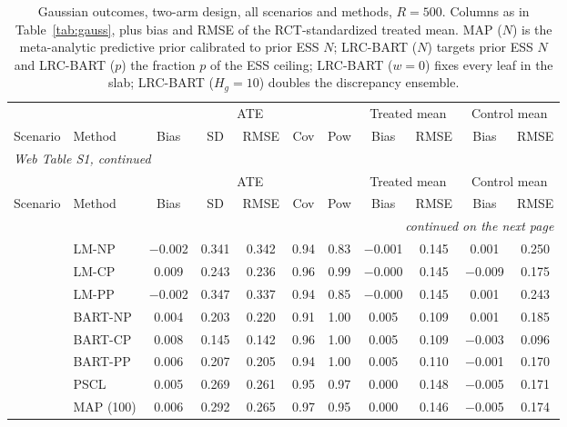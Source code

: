 \documentclass[11pt]{article}
\theoremstyle{definition}
\theoremstyle{plain}
\begin{document}
\begin{center}
\scriptsize
\setlength{\tabcolsep}{3.5pt}
\renewcommand{\arraystretch}{0.8}
\begin{longtable}{llccccccccc}
\caption{Gaussian outcomes, two-arm design, all scenarios and methods, $R=500$. Columns as in Table~\ref{tab:gauss}, plus bias and RMSE of the RCT-standardized treated mean. MAP ($N$) is the meta-analytic predictive prior calibrated to prior ESS $N$; LRC-BART ($N$) targets prior ESS $N$ and LRC-BART ($p$) the fraction $p$ of the ESS ceiling; LRC-BART ($w=0$) fixes every leaf in the slab; LRC-BART ($H_g=10$) doubles the discrepancy ensemble.}\label{tab:gauss_full}\\
\toprule
& & \multicolumn{5}{c}{ATE} & \multicolumn{2}{c}{Treated mean} & \multicolumn{2}{c}{Control mean} \\
\cmidrule(lr){3-7}\cmidrule(lr){8-9}\cmidrule(lr){10-11}
Scenario & Method & Bias & SD & RMSE & Cov & Pow & Bias & RMSE & Bias & RMSE \\
\midrule
\endfirsthead
\multicolumn{11}{l}{\textit{Web Table S1, continued}}\\
\toprule
& & \multicolumn{5}{c}{ATE} & \multicolumn{2}{c}{Treated mean} & \multicolumn{2}{c}{Control mean} \\
\cmidrule(lr){3-7}\cmidrule(lr){8-9}\cmidrule(lr){10-11}
Scenario & Method & Bias & SD & RMSE & Cov & Pow & Bias & RMSE & Bias & RMSE \\
\midrule
\endhead
\midrule
\multicolumn{11}{r}{\textit{continued on the next page}}\\
\endfoot
\bottomrule
\endlastfoot
\multirow{20}{*}{Sc1} & LM-NP & $-$0.002 & 0.341 & 0.342 & 0.94 & 0.83 & $-$0.001 & 0.145 & 0.001 & 0.250 \\
& LM-CP & 0.009 & 0.243 & 0.236 & 0.96 & 0.99 & $-$0.000 & 0.145 & $-$0.009 & 0.175 \\
& LM-PP & $-$0.002 & 0.347 & 0.337 & 0.94 & 0.85 & $-$0.000 & 0.145 & 0.001 & 0.243 \\
& BART-NP & 0.004 & 0.203 & 0.220 & 0.91 & 1.00 & 0.005 & 0.109 & 0.001 & 0.185 \\
& BART-CP & 0.008 & 0.145 & 0.142 & 0.96 & 1.00 & 0.005 & 0.109 & $-$0.003 & 0.096 \\
& BART-PP & 0.006 & 0.207 & 0.205 & 0.94 & 1.00 & 0.005 & 0.110 & $-$0.001 & 0.170 \\
& PSCL & 0.005 & 0.269 & 0.261 & 0.95 & 0.97 & 0.000 & 0.148 & $-$0.005 & 0.171 \\
& MAP (100) & 0.006 & 0.292 & 0.265 & 0.97 & 0.95 & 0.000 & 0.146 & $-$0.005 & 0.174 \\

\end{longtable}
\end{center}
\end{document}
